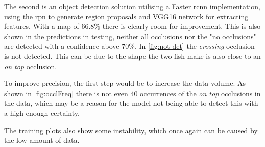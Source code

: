 The second is an object detection solution utilising a Faster \gls{rcnn} implementation, using the \gls{rpn} to generate region proposals and VGG16 network for extracting features. With a \gls{map} of $66.8\%$ there is clearly room for improvement. This is also shown in the predictions in testing, neither all occlusions nor the "no occlusions" are detected with a confidence above $70\%$. In \autoref{fig:not-det} the \textit{crossing} occlusion is not detected. This can be due to the shape the two fish make is also close to an \textit{on top} occlusion.

To improve precision, the first step would be to increase the data volume. As shown in \autoref{fig:occlFreq} there is not even 40 occurrences of the \textit{on top} occlusions in the data, which may be a reason for the model not being able to detect this with a high enough certainty.

The training plots also show some instability, which once again can be caused by the low amount of data.\\
